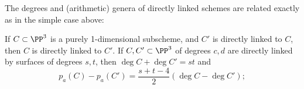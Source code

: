 
%
%



The degrees and (arithmetic) genera 
of directly linked schemes are related exactly as in the simple case above:

\begin{theorem}\label{direct linkage}
If $C\subset \PP^3$ is a purely 1-dimensional subscheme, and ${C'}$ is directly linked to $C$, then $C$ is directly linked to ${C'}$.
If $C,{C'}\subset \PP^3$ of degrees $c,d$ are directly linked by surfaces of degrees $s,t$, then 
$\deg C+\deg C' = st$ and 
 \begin{equation}\label{linked genus formula}
p_a(C) - p_a({C'}) = \frac{s+t-4}{2}(\deg C - \deg C');
\end{equation}
\end{theorem}

